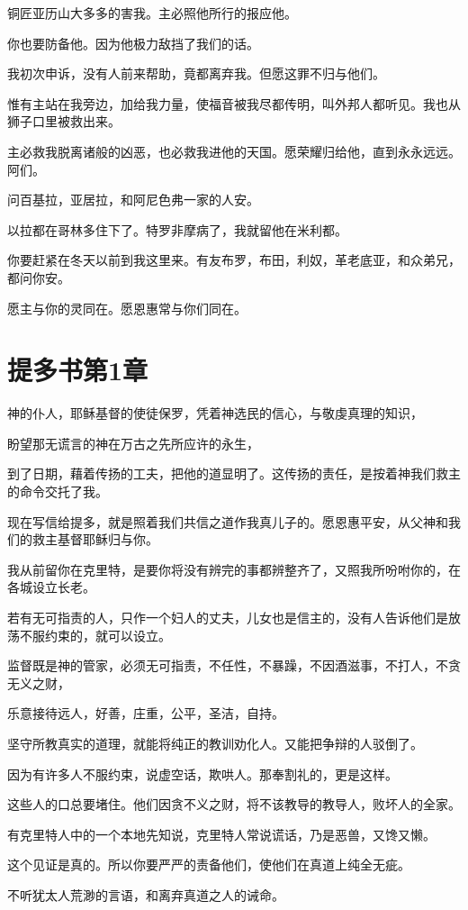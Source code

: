 \documentclass[12pt,oneside]{book}
\begin{document}
铜匠亚历山大多多的害我。主必照他所行的报应他。

你也要防备他。因为他极力敌挡了我们的话。

我初次申诉，没有人前来帮助，竟都离弃我。但愿这罪不归与他们。

惟有主站在我旁边，加给我力量，使福音被我尽都传明，叫外邦人都听见。我也从狮子口里被救出来。

主必救我脱离诸般的凶恶，也必救我进他的天国。愿荣耀归给他，直到永永远远。阿们。

问百基拉，亚居拉，和阿尼色弗一家的人安。

以拉都在哥林多住下了。特罗非摩病了，我就留他在米利都。

你要赶紧在冬天以前到我这里来。有友布罗，布田，利奴，革老底亚，和众弟兄，都问你安。

愿主与你的灵同在。愿恩惠常与你们同在。

\chapter{提多书第1章}
神的仆人，耶稣基督的使徒保罗，凭着神选民的信心，与敬虔真理的知识，

盼望那无谎言的神在万古之先所应许的永生，

到了日期，藉着传扬的工夫，把他的道显明了。这传扬的责任，是按着神我们救主的命令交托了我。

现在写信给提多，就是照着我们共信之道作我真儿子的。愿恩惠平安，从父神和我们的救主基督耶稣归与你。

我从前留你在克里特，是要你将没有辨完的事都辨整齐了，又照我所吩咐你的，在各城设立长老。

若有无可指责的人，只作一个妇人的丈夫，儿女也是信主的，没有人告诉他们是放荡不服约束的，就可以设立。

监督既是神的管家，必须无可指责，不任性，不暴躁，不因酒滋事，不打人，不贪无义之财，

乐意接待远人，好善，庄重，公平，圣洁，自持。

坚守所教真实的道理，就能将纯正的教训劝化人。又能把争辩的人驳倒了。

因为有许多人不服约束，说虚空话，欺哄人。那奉割礼的，更是这样。

这些人的口总要堵住。他们因贪不义之财，将不该教导的教导人，败坏人的全家。

有克里特人中的一个本地先知说，克里特人常说谎话，乃是恶兽，又馋又懒。

这个见证是真的。所以你要严严的责备他们，使他们在真道上纯全无疵。

不听犹太人荒渺的言语，和离弃真道之人的诫命。
\end{document}
